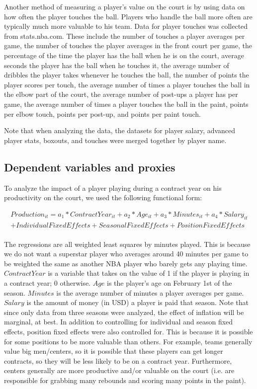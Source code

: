 \documentclass[12pt]{article}
\begin{document}
	Another method of measuring a player's value on the court is by using data on how often the player touches the ball. Players who handle the ball more often are typically much more valuable to his team. Data for player touches was collected from stats.nba.com. These include the number of touches a player averages per game, the number of touches the player averages in the front court per game, the percentage of the time the player has the ball when he is on the court, average seconds the player has the ball when he touches it, the average number of dribbles the player takes whenever he touches the ball, the number of points the player scores per touch, the average number of times a player touches the ball in the elbow part of the court, the average number of post-ups a player has per game, the average number of times a player touches the ball in the paint, points per elbow touch, points per post-up, and points per paint touch. 

	Note that when analyzing the data, the datasets for player salary, advanced player stats, boxouts, and touches were merged together by player name. 
	
	\subsection{Dependent variables and proxies}
	
	To analyze the impact of a player playing during a contract year on his productivity on the court, we used the following functional form:
	
	\[
	\begin{aligned}
	Production_{it} = a_1*ContractYear_{it} + a_2*Age_{it} + a_3*Minutes_{it} + a_4*Salary_{it}  \\
	+ IndividualFixedEffects + SeasonalFixedEffects + PositionFixedEffects \\
	\end{aligned}
	\]
	
	The regressions are all weighted least squares by minutes played. This is because we do not want a superstar player who averages around 40 minutes per game to be weighted the same as another NBA player who barely gets any playing time. $ContractYear$ is a variable that takes on the value of 1 if the player is playing in a contract year; 0 otherwise. $Age$ is the player's age on February 1st of the season. $Minutes$ is the average number of minutes a player averages per game. $Salary$ is the amount of money (in USD) a player is paid that season. Note that since only data from three seasons were analyzed, the effect of inflation will be marginal, at best. In addition to controlling for individual and season fixed effects, position fixed effects were also controlled for. This is because it is possible for some positions to be more valuable than others. For example, teams generally value big men/centers, so it is possible that these players can get longer contracts, so they will be less likely to be on a contract year. Furthermore, centers generally are more productive and/or valuable on the court (i.e. are responsible for grabbing many rebounds and scoring many points in the paint). 
	
\end{document}
